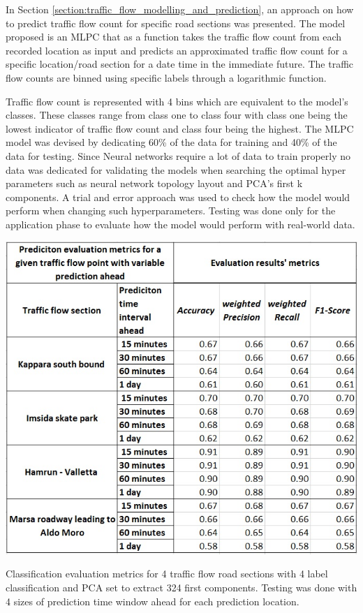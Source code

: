 \documentclass[12pt, a4paper]{report}
\theoremstyle{definition}
\theoremstyle{definition}%
\theoremstyle{definition}%
\theoremstyle{definition}%
\theoremstyle{definition}%
\theoremstyle{definition}%
\begin{document}
In Section \ref{section:traffic_flow_modelling_and_prediction}, an approach on how to predict traffic flow count for specific road sections was presented. The model proposed is an MLPC that as a function takes the traffic flow count from each recorded location as input and predicts an approximated traffic flow count for a specific location/road section for a date time in the immediate future. The traffic flow counts are binned using specific labels through a logarithmic function. 

Traffic flow count is represented with 4 bins which are equivalent to the model's classes. These classes range from class one to class four with class one being the lowest indicator of traffic flow count and class four being the highest. The MLPC model was devised by dedicating 60\% of the data for training and 40\% of the data for testing. Since Neural networks require a lot of data to train properly no data was dedicated for validating the models when searching the optimal hyper  parameters such as neural network topology layout and PCA's first k components. A trial and error approach was used to check how the model would perform when changing such hyperparameters. Testing was done only for the application phase to evaluate how the model would perform with real-world data. 

\begin{table}[t!]	
	\includegraphics[scale=0.75]{classification_metrics_result.jpg}
	\centering
	\caption[Classification evaluation metrics for traffic flow prediction]{Classification evaluation metrics for 4 traffic flow road sections with 4 label classification and PCA set to extract 324 first components. Testing was done with 4 sizes of prediction time window ahead for each prediction location.}
	\label{table:classification_mertrics}
\end{table}
\end{document}
